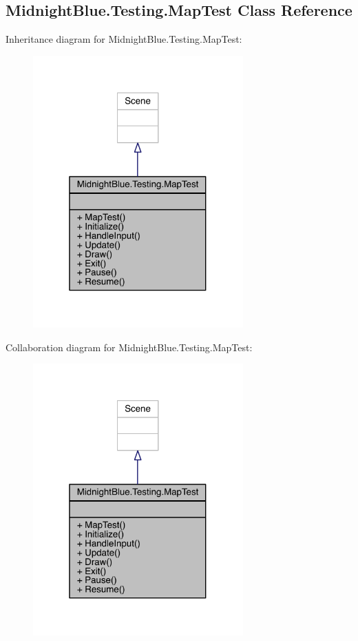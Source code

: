 \hypertarget{class_midnight_blue_1_1_testing_1_1_map_test}{}\subsection{Midnight\+Blue.\+Testing.\+Map\+Test Class Reference}
\label{class_midnight_blue_1_1_testing_1_1_map_test}


Inheritance diagram for Midnight\+Blue.\+Testing.\+Map\+Test\+:\nopagebreak
\begin{figure}[H]
\begin{center}
\leavevmode
\includegraphics[width=229pt]{class_midnight_blue_1_1_testing_1_1_map_test__inherit__graph}
\end{center}
\end{figure}


Collaboration diagram for Midnight\+Blue.\+Testing.\+Map\+Test\+:\nopagebreak
\begin{figure}[H]
\begin{center}
\leavevmode
\includegraphics[width=229pt]{class_midnight_blue_1_1_testing_1_1_map_test__coll__graph}
\end{center}
\end{figure}
